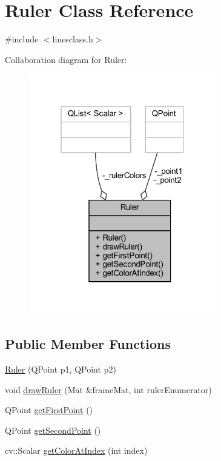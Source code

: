 \hypertarget{classRuler}{}\section{Ruler Class Reference}
\label{classRuler}


{\ttfamily \#include $<$linesclass.\+h$>$}



Collaboration diagram for Ruler\+:
\nopagebreak
\begin{figure}[H]
\begin{center}
\leavevmode
\includegraphics[width=232pt]{classRuler__coll__graph}
\end{center}
\end{figure}
\subsection*{Public Member Functions}
\begin{DoxyCompactItemize}
\item 
\mbox{\hyperlink{classRuler_a9e0723f35460c16a91ee88278982e3e9}{Ruler}} (Q\+Point p1, Q\+Point p2)
\item 
void \mbox{\hyperlink{classRuler_aa86402b06c3d92112d49ca41e65b1897}{draw\+Ruler}} (Mat \&frame\+Mat, int ruler\+Enumerator)
\item 
Q\+Point \mbox{\hyperlink{classRuler_acd500bb44e0a7f79e881ae15e0a6a03a}{get\+First\+Point}} ()
\item 
Q\+Point \mbox{\hyperlink{classRuler_a8a39371560dd77a617496fffddc47966}{get\+Second\+Point}} ()
\item 
cv\+::\+Scalar \mbox{\hyperlink{classRuler_ae7e524a583b89c5905d1aee2d6ecb85d}{get\+Color\+At\+Index}} (int index)
\end{DoxyCompactItemize}
